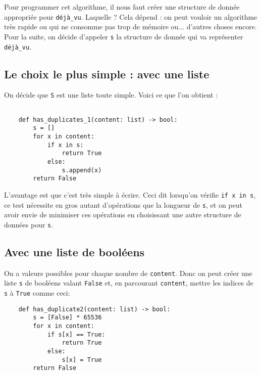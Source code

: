 \documentclass[a4paper,10pt,cours]{nsi}
\begin{document}
Pour programmer cet algorithme, il nous faut créer une structure de donnée appropriée pour \texttt{déjà\_vu}. Laquelle ? Cela dépend : on peut vouloir un algorithme très rapide ou qui ne consomme pas trop de mémoire ou... d'autres choses encore.\\

Pour la suite, on décide d'appeler \texttt{s} la structure de donnée qui va représenter \texttt{déjà\_vu}.
\subsection{Le choix le plus simple : avec une liste}

On décide que \texttt{S} est une liste toute simple. Voici ce que l'on obtient :

\begin{pyc}
    \begin{verbatim}

    def has_duplicates_1(content: list) -> bool:
        s = []
        for x in content:
            if x in s:
                return True
            else:
                s.append(x)
        return False

\end{verbatim}
\end{pyc}

L'avantage est que c'est très simple à écrire. Ceci dit lorsqu'on vérifie \texttt{if x in s}, ce test nécessite en gros autant d'opérations que la longueur de \texttt{s}, et on peut avoir envie de minimiser ces opérations en choisissant une autre structure de données pour \texttt{s}.

\subsection{Avec une liste de booléens}

On a  valeurs possibles pour chaque nombre de \texttt{content}. Donc on peut créer une liste \texttt{s} de  booléens valant \texttt{False} et, en parcourant \texttt{content}, mettre les indices de \texttt{s} à \texttt{True} comme ceci:


\begin{pyc}
    \begin{verbatim}
    def has_duplicate2(content: list) -> bool:
        s = [False] * 65536
        for x in content:
            if s[x] == True:
                return True
            else:
                s[x] = True
        return False
\end{verbatim}
\end{pyc}
\end{document}
